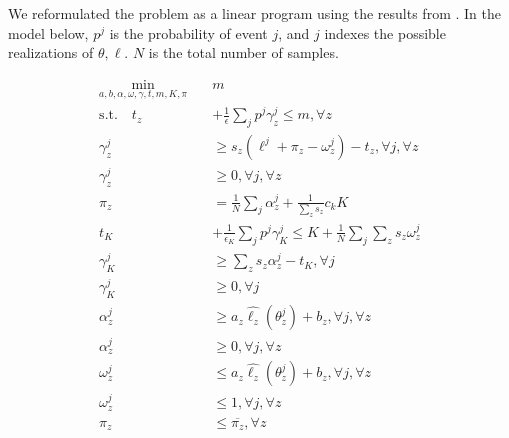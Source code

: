 \documentclass[11pt]{article}
\begin{document}
    We reformulated the problem as a linear program  using the results from \cite{rockafellar2000optimization}. In the model below, $p^j$ is the probability of event $j$, and $j$ indexes the possible realizations of $\theta, \ell$. $N$ is the total number of samples. 

    \begin{align}
      \min_{a,b,\alpha,\omega,\gamma,t,m,K,\pi} \quad & m\\
      \text{s.t.} \quad t_z &+ \frac{1}{\epsilon} \sum_j p^j \gamma_z^j \leq m, \forall z\\
      \gamma_z^j &\geq s_z \left (\ell^j + \pi_z - \omega^j_z \right ) -t_z, \forall j, \forall z \\
      \gamma_z^j &\geq 0, \forall j, \forall z\\
      \pi_z &= \frac{1}{N} \sum_j \alpha^j_z + \frac{1}{\sum_z s_z} c_k K\\
      t_K &+ \frac{1}{\epsilon_K} \sum_j p^j \gamma_K^j \leq K+ \frac{1}{N}\sum_j \sum_z s_z \omega^j_z\\
      \gamma_K^j &\geq \sum_z s_z \alpha^j_z -t_K, \forall j \\
      \gamma_K^j &\geq 0, \forall j\\
      \alpha^j_z &\geq a_z \hat{\ell_z}(\theta^j_z) + b_z, \forall j, \forall z\\
      \alpha^j_z &\geq 0, \forall j, \forall z\\
      \omega^j_z &\leq a_z \hat{\ell_z}(\theta^j_z) + b_z, \forall j, \forall z\\
      \omega^j_z &\leq 1, \forall j, \forall z\\
      \pi_z &\leq \overline{\pi_z}, \forall z
    \end{align}
\end{document}

